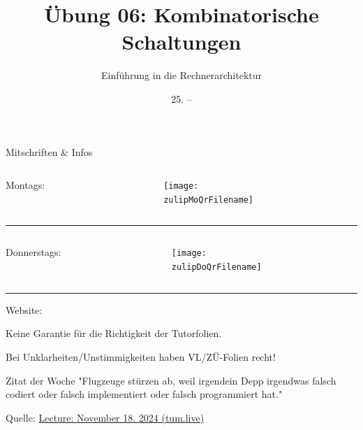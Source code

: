 \documentclass[
  german,            %
  aspectratio=169,    %
]{tumbeamer}
\title{Übung 06: Kombinatorische Schaltungen}
\subtitle{Einführung in die Rechnerarchitektur}
\author{\theAuthorName}
\institute{\theGroupName\\\theSchoolName\\\theUniversityName}
\date{25. -- \DTMdisplaydate{2024}{11}{31}{-1}}
\begin{document}
\maketitle

\begin{frame}[c]{Mitschriften \& Infos}{}
  \begin{minipage}[t]{\textwidth}
    \begin{columns}[c]
      \begin{column}{0.8\textwidth}
        Montags: \href{\zulipMo}{\zulipMo}
      \end{column}
      \begin{column}{0.2\textwidth}
        \texttt{[image: \\zulipMoQrFilename]}
      \end{column}
    \end{columns}
  \end{minipage}
  \rule{\textwidth}{0.4pt}
  \begin{minipage}[t]{\textwidth}
    \begin{columns}[c]
      \begin{column}{0.8\textwidth}
        Donnerstags: \href{\zulipDo}{\zulipDo}
      \end{column}
      \begin{column}{0.2\textwidth}
        \texttt{[image: \\zulipDoQrFilename]}
      \end{column}
    \end{columns}
  \end{minipage}
  \ifdefined\myWebsite
  \rule{\textwidth}{0.4pt}
  \centering
  Website: \href{\myWebsite}{\myWebsite}
  \fi
\end{frame}

\begin{frame}[c]{}{}
  \begin{center}
    \LARGE  Keine Garantie für die Richtigkeit der Tutorfolien.

    \Large Bei Unklarheiten/Unstimmigkeiten haben VL/ZÜ-Folien recht!
  \end{center}
\end{frame}

\begin{frame}[c]{}{}
  \begin{center}
    \begin{block}{Zitat der Woche}
      \vspace{0.5cm}
      "Flugzeuge stürzen ab, weil irgendein Depp irgendwas falsch codiert oder falsch implementiert oder falsch programmiert hat."  
      \vspace{0.5cm}
    \end{block}
    \vspace{0.5cm}
    Quelle: \href{https://tum.live/w/ws24EidR/50021?t=2268}{Lecture: November 18. 2024 (tum.live)}
  \end{center}
\end{frame}
\end{document}
